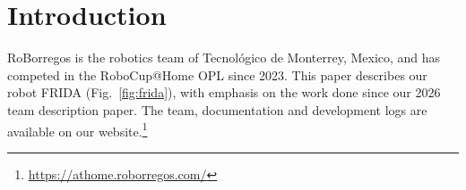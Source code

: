 \section{Introduction}
RoBorregos is the robotics team of Tecnológico de Monterrey, Mexico, and has competed in the RoboCup@Home OPL since 2023. This paper describes our robot FRIDA (Fig.~\ref{fig:frida}), with emphasis on the work done since our 2026 team description paper. The team, documentation and development logs are available on our website.\footnote{\url{https://athome.roborregos.com/}}

